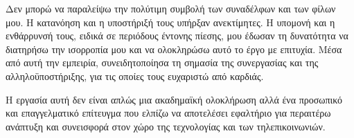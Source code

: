 Δεν μπορώ να παραλείψω την πολύτιμη συμβολή των συναδέλφων και των φίλων μου. Η κατανόηση και η υποστήριξή τους υπήρξαν ανεκτίμητες. Η υπομονή και η ενθάρρυνσή τους, ειδικά σε περιόδους έντονης πίεσης, μου έδωσαν τη δυνατότητα να διατηρήσω την ισορροπία μου και να ολοκληρώσω αυτό το έργο με επιτυχία. Μέσα από αυτή την εμπειρία, συνειδητοποίησα τη σημασία της συνεργασίας και της αλληλοϋποστήριξης, για τις οποίες τους ευχαριστώ από καρδιάς.

Η εργασία αυτή δεν είναι απλώς μια ακαδημαϊκή ολοκλήρωση αλλά ένα προσωπικό και επαγγελματικό επίτευγμα που ελπίζω να αποτελέσει εφαλτήριο για περαιτέρω ανάπτυξη και συνεισφορά στον χώρο της τεχνολογίας και των τηλεπικοινωνιών.
